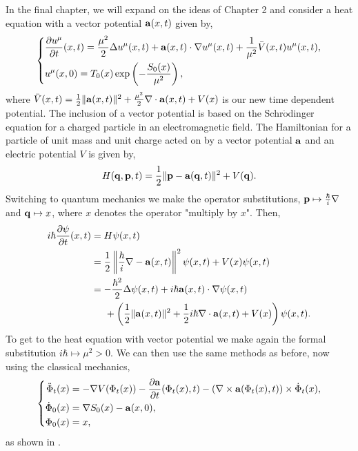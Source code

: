 \documentclass[a4paper,12pt,draft]{report}
\theoremstyle{remark}
\theoremstyle{definition}
\begin{document}
In the final chapter, we will expand on the ideas of Chapter 2 and consider a heat equation with a vector potential $\bold{a}(x, t)$ given by,
$$
\left\{
\begin{aligned}
& \frac{\partial u^\mu}{\partial t}(x, t) = \frac{\mu^2}{2}\Delta u^\mu(x, t) + \bold{a}(x, t)\cdot\nabla u^\mu(x, t) + \frac{1}{\mu^2}\bar{V}(x, t)u^\mu(x, t),\\ \label{VPHE}
& u^\mu(x, 0) = T_0(x)\exp\left(-\frac{S_0(x)}{\mu^2}\right),
\end{aligned}
\right.
$$
where $\bar{V}(x, t) = \frac{1}{2}\|\bold{a}(x, t)\|^2 + \frac{\mu^2}{2}\nabla\cdot\bold{a}(x, t) + V(x)$ is our new time dependent potential.  The inclusion of a vector potential is based on the Schr$\ddot{\text{o}}$dinger equation for a charged particle in an electromagnetic field.  The Hamiltonian for a particle of unit mass and unit charge acted on by a vector potential $\bold{a}$ and an electric potential $V$ is given by,
$$
H(\bold{q}, \bold{p}, t) = \frac{1}{2}\|\bold{p} - \bold{a}(\bold{q}, t)\|^2 + V(\bold{q}).
$$
Switching to quantum mechanics we make the operator substitutions, $\bold{p} \mapsto \frac{\hbar}{i}\nabla$ and $\bold{q} \mapsto x$, where $x$ denotes the operator "multiply by $x$".  Then,
\begin{align}
i\hbar\frac{\partial\psi}{\partial t}(x, t) & = H\psi(x, t)\nonumber\\
& = \frac{1}{2}\left\|\frac{\hbar}{i}\nabla - \bold{a}(x, t)\right\|^2\psi(x, t) + V(x)\psi(x, t)\nonumber\\
& = -\frac{\hbar^2}{2}\Delta\psi(x, t) + i\hbar\bold{a}(x, t)\cdot\nabla\psi(x, t)\nonumber\\
& \hspace{0.5cm} + \left(\frac{1}{2}\|\bold{a}(x, t)\|^2 + \frac{1}{2}i\hbar\nabla\cdot\bold{a}(x, t) + V(x)\right)\psi(x, t).\nonumber
\end{align}
To get to the heat equation with vector potential we make again the formal substitution $i\hbar \mapsto \mu^2 > 0$.  We can then use the same methods as before, now using the classical mechanics,
$$
\left\{
\begin{aligned}
\ddot{\Phi}_t(x) & = -\nabla V(\Phi_t(x)) - \frac{\partial \bold{a}}{\partial t}(\Phi_t(x), t) - (\nabla \times \bold{a}(\Phi_t(x), t))\times\dot{\Phi}_t(x),\\ \label{CMFM2}
\dot{\Phi}_0(x) & = \nabla S_0(x) - \bold{a}(x, 0),\\
\Phi_0(x) & = x,
\end{aligned}
\right.
$$
as shown in \cite{ANSRAT}.
\end{document}
